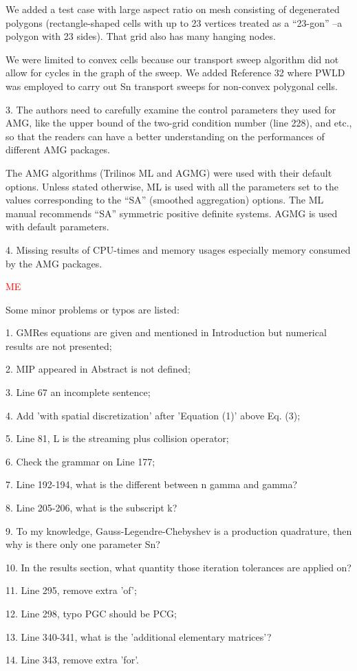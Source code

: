 \documentclass{article}
\begin{document}
We added a test case with large aspect ratio on mesh consisting of degenerated polygons (rectangle-shaped cells with up to 23 vertices treated as a ``23-gon'' --a polygon with 23 sides). That grid also has many hanging nodes.

We were limited to convex cells because our transport sweep algorithm did not allow for cycles in the graph of the sweep. We added Reference 32 where PWLD was employed to carry out Sn transport sweeps for non-convex polygonal cells. %

\bigskip


{
\color{blue}
3. The authors need to carefully examine the control parameters they used for AMG, like the upper bound of the two-grid condition number (line 228), and etc., so that the readers can have a better understanding on the performances of different AMG packages.
}

The AMG algorithms (Trilinos ML and AGMG) were used with their default options. Unless stated otherwise, ML is
used with all the parameters set to the values corresponding to the ``SA'' (smoothed aggregation) options. The ML manual recommends ``SA'' symmetric positive definite systems.
AGMG is used with default parameters. 


\bigskip


{
\color{blue}
4. Missing results of CPU-times and memory usages especially memory consumed by the AMG packages.
}


\textcolor{red}{ME}

\bigskip


{
\color{blue}
\noindent
Some minor problems or typos are listed:

1. GMRes equations are given and mentioned in Introduction but numerical results are not presented;

2. MIP appeared in Abstract is not defined;

3. Line 67 an incomplete sentence;

4. Add 'with spatial discretization' after 'Equation (1)' above Eq. (3);

5. Line 81, L is the streaming plus collision operator;

6. Check the grammar on Line 177;

7. Line 192-194, what is the different between n gamma and gamma?

8. Line 205-206, what is the subscript k?

9. To my knowledge, Gauss-Legendre-Chebyshev is a production quadrature, then why is there only one parameter Sn?

10. In the results section, what quantity those iteration tolerances are applied on?

11. Line 295, remove extra 'of';

12. Line 298, typo PGC should be PCG;

13. Line 340-341, what is the 'additional elementary matrices'?

14. Line 343, remove extra 'for'.}
\end{document}
